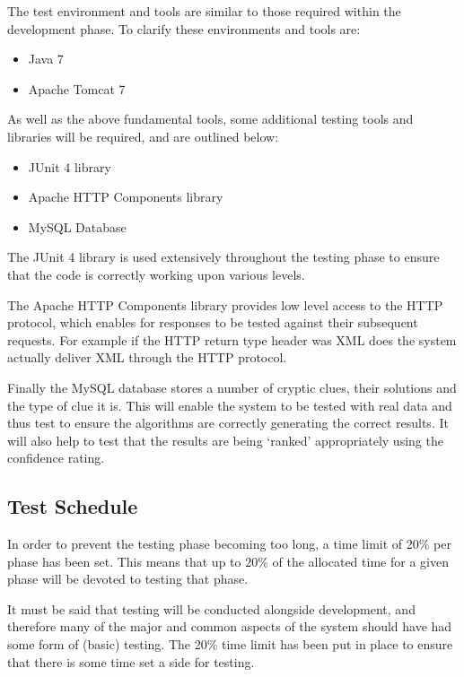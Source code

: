 The test environment and tools are similar to those required within the 
development phase. To clarify these environments and tools are:

\begin{itemize}
  \item Java 7
  \item Apache Tomcat 7
\end{itemize}

As well as the above fundamental tools, some additional testing tools and 
libraries will be required, and are outlined below:

\begin{itemize}
  \item JUnit 4 library
  \item Apache HTTP Components library
  \item MySQL Database
\end{itemize}

The JUnit 4 library is used extensively throughout the testing phase to ensure
that the code is correctly working upon various levels.

The Apache HTTP Components library provides low level access to the HTTP
protocol, which enables for responses to be tested against their subsequent
requests. For example if the HTTP return type header was XML does the system
actually deliver XML through the HTTP protocol.

Finally the MySQL database stores a number of cryptic clues, their solutions and
the type of clue it is. This will enable the system to be tested with real data
and thus test to ensure the algorithms are correctly generating the correct 
results. It will also help to test that the results are being `ranked' 
appropriately using the confidence rating.


\subsection{Test Schedule}
\label{sub:test_schedule}

In order to prevent the testing phase becoming too long, a time limit of 20\% 
per phase has been set. This means that up to 20\% of the allocated time for a 
given phase will be devoted to testing that phase.

It must be said that testing will be conducted alongside development, and 
therefore many of the major and common aspects of the system should have had 
some form of (basic) testing. The 20\% time limit has been put in place to 
ensure that there is some time set a side for testing.

